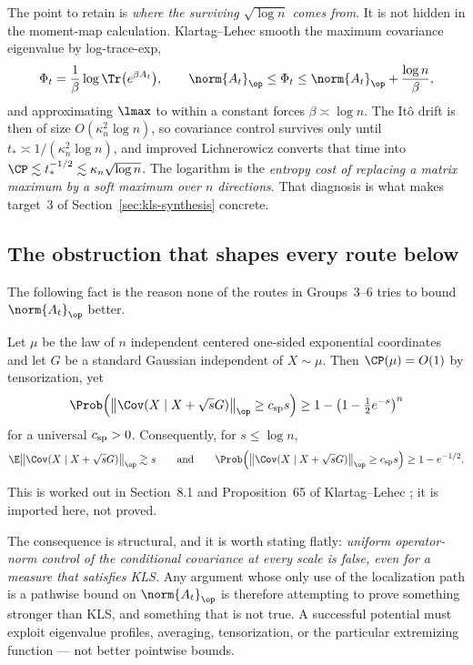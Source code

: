 \documentclass[../../main.tex]{subfiles}
\begin{document}
The point to retain is \emph{where the surviving $\sqrt{\log n}$ comes from}. It is not hidden in
the moment-map calculation. Klartag--Lehec smooth the maximum covariance eigenvalue by
log-trace-exp,
\[
  \Phi_t=\frac1\beta\log\Tr\bigl(e^{\beta A_t}\bigr),
  \qquad
  \norm{A_t}_\op\le\Phi_t\le\norm{A_t}_\op+\frac{\log n}\beta ,
\]
and approximating $\lmax$ to within a constant forces $\beta\asymp\log n$. The It\^o drift is then
of size $O(\kappa_n^2\log n)$, so covariance control survives only until
$t_*\asymp1/(\kappa_n^2\log n)$, and improved Lichnerowicz converts that time into
$\CP\lesssim t_*^{-1/2}\lesssim\kappa_n\sqrt{\log n}$. The logarithm is the \emph{entropy cost of
replacing a matrix maximum by a soft maximum over $n$ directions}. That diagnosis is what makes
target~3 of Section~\ref{sec:kls-synthesis} concrete.

\subsection{The obstruction that shapes every route below}
\label{subsec:kls-spike-obstruction}

The following fact is the reason none of the routes in Groups~3--6 tries to bound
$\norm{A_t}_\op$ better.

\begin{proposition}
\label{prop:covariance-spike}
Let $\mu$ be the law of $n$ independent centered one-sided exponential coordinates and let $G$ be a
standard Gaussian independent of $X\sim\mu$. Then $\CP(\mu)=O(1)$ by tensorization, yet
\[
  \Prob\!\left(
    \bigl\lVert\Cov(X\mid X+\sqrt sG)\bigr\rVert_\op\ge c_{\rm sp}s
  \right)
  \ge1-\left(1-\tfrac12e^{-s}\right)^n
\]
for a universal $c_{\rm sp}>0$. Consequently, for $s\le\log n$,
\[
  \E\bigl\lVert\Cov(X\mid X+\sqrt sG)\bigr\rVert_\op\gtrsim s
  \qquad\text{and}\qquad
  \Prob\!\left(
    \bigl\lVert\Cov(X\mid X+\sqrt sG)\bigr\rVert_\op\ge c_{\rm sp}s
  \right)\ge1-e^{-1/2}.
\]
\end{proposition}

This is worked out in Section~8.1 and Proposition~65 of Klartag--Lehec \cite{KLnotes}; it is
imported here, not proved.

The consequence is structural, and it is worth stating flatly: \emph{uniform operator-norm control
of the conditional covariance at every scale is false, even for a measure that satisfies KLS.}
Any argument whose only use of the localization path is a pathwise bound on
$\norm{A_t}_\op$ is therefore attempting to prove something stronger than KLS, and something that
is not true. A successful potential must exploit eigenvalue profiles, averaging, tensorization, or
the particular extremizing function --- not better pointwise bounds.
\end{document}
